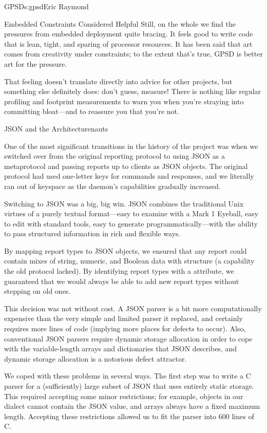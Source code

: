 \begin{aosachapter}{GPSD}{s:gpsd}{Eric Raymond}
\begin{aosasect1}{Embedded Constraints Considered Helpful}
Still, on the whole we find the pressures from embedded deployment
quite bracing.  It feels good to write code that is lean, tight, and
sparing of processor resources.  It has been said that art comes from
creativity under constraints; to the extent that's true, GPSD is
better art for the pressure.

That feeling doesn't translate directly into advice for other
projects, but something else definitely does: don't guess, measure!
There is nothing like regular profiling and footprint measurements to
warn you when you're straying into committing bloat---and to reassure
you that you're not.

\end{aosasect1}

\begin{aosasect1}{JSON and the Architecturenauts}

One of the most significant transitions in the history of the project
was when we switched over from the original reporting protocol to
using JSON as a metaprotocol and passing reports up to clients as JSON
objects. The original protocol had used one-letter keys for commands
and responses, and we literally ran out of keyspace as the daemon's
capabilities gradually increased.

Switching to JSON was a big, big win. JSON combines the traditional
Unix virtues of a purely textual format---easy to examine with a Mark
1 Eyeball, easy to edit with standard tools, easy to generate
programmatically---with the ability to pass structured information in
rich and flexible ways.

By mapping report types to JSON objects, we ensured that any report
could contain mixes of string, numeric, and Boolean data with
structure (a capability the old protocol lacked).  By identifying
report types with a  attribute, we guaranteed that we
would always be able to add new report types without stepping on old
ones.

This decision was not without cost.  A JSON parser is a bit more
computationally expensive than the very simple and limited parser it
replaced, and certainly requires more lines of code (implying more
places for defects to occur). Also, conventional JSON parsers require
dynamic storage allocation in order to cope with the variable-length
arrays and dictionaries that JSON describes, and dynamic storage
allocation is a notorious defect attractor.

We coped with these problems in several ways. The first step was to
write a C parser for a (sufficiently) large subset of JSON that uses
entirely static storage.  This required accepting some minor
restrictions; for example, objects in our dialect cannot contain the
JSON  value, and arrays always have a fixed maximum length.
Accepting these restrictions allowed us to fit the parser into 600
lines of C.


\end{aosasect1}
\end{aosachapter}
